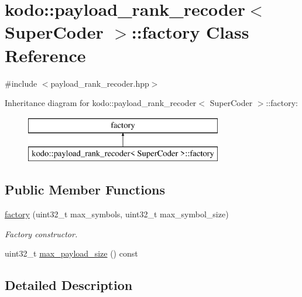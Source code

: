 \hypertarget{classkodo_1_1payload__rank__recoder_1_1factory}{\section{kodo\-:\-:payload\-\_\-rank\-\_\-recoder$<$ Super\-Coder $>$\-:\-:factory Class Reference}
\label{classkodo_1_1payload__rank__recoder_1_1factory}
}


{\ttfamily \#include $<$payload\-\_\-rank\-\_\-recoder.\-hpp$>$}

Inheritance diagram for kodo\-:\-:payload\-\_\-rank\-\_\-recoder$<$ Super\-Coder $>$\-:\-:factory\-:\begin{figure}[H]
\begin{center}
\leavevmode
\includegraphics[height=2.000000cm]{classkodo_1_1payload__rank__recoder_1_1factory}
\end{center}
\end{figure}
\subsection*{Public Member Functions}
\begin{DoxyCompactItemize}
\item 
\hyperlink{classkodo_1_1payload__rank__recoder_1_1factory_a6c181c3355c24a883c1fcd1c602c7225}{factory} (uint32\-\_\-t max\-\_\-symbols, uint32\-\_\-t max\-\_\-symbol\-\_\-size)
\begin{DoxyCompactList}\small\item\em Factory constructor. \end{DoxyCompactList}\item 
uint32\-\_\-t \hyperlink{classkodo_1_1payload__rank__recoder_1_1factory_ae2f12ab05516867ab69268b85b8285f3}{max\-\_\-payload\-\_\-size} () const 
\begin{DoxyCompactList}\small\item\em \end{DoxyCompactList}\end{DoxyCompactItemize}


\subsection{Detailed Description}
